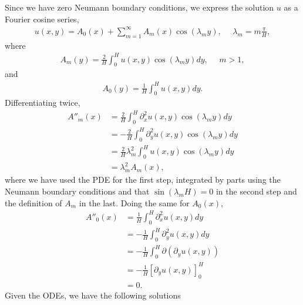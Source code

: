 \begin{questions}


\begin{solution}
Since we have zero Neumann boundary conditions, we express the solution $u$ as a Fourier cosine series,
\begin{align*}
u(x,y)=A_0(x)+\sum_{m=1}^{\infty}A_m(x)\cos(\lambda_my),~~~~~~\lambda_m=m\frac{\pi}{H},
\end{align*}
where
\begin{align*}
A_m(y)=\frac{2}{H}\int_0^Hu(x,y)\cos(\lambda_my)dy,~~~~~~m>1,
\end{align*}
and
\begin{align*}
A_0(y)=\frac{1}{H}\int_0^Hu(x,y)dy.
\end{align*}
Differentiating twice,
\begin{align*}
A''_m(x)&=\frac{2}{H}\int_0^H\partial^2_xu(x,y)\cos(\lambda_my)dy\\
&=-\frac{2}{H}\int_0^H\partial^2_yu(x,y)\cos(\lambda_my)dy\\
&=\frac{2}{H}\lambda_m^2\int_0^Hu(x,y)\cos(\lambda_my)dy\\
&=\lambda_m^2A_m(x),
\end{align*}
where we have used the PDE for the first step, integrated by parts using the Neumann boundary conditions and that $\sin(\lambda_mH)=0$ in the second step and the definition of $A_m$ in the last. Doing the same for $A_0(x)$,
\begin{align*}
A''_0(x)&=\frac{1}{H}\int_0^H\partial^2_xu(x,y)dy\\
&=-\frac{1}{H}\int_0^H\partial^2_yu(x,y)dy\\
&=-\frac{1}{H}\int_0^H\partial(\partial_yu(x,y))\\
&=-\frac{1}{H}\left[\partial_yu(x,y)\right]_0^H\\
&=0.
\end{align*}
Given the ODEs, we have the following solutions
\begin{align*}

\end{align*}
\end{solution}
\end{questions}
